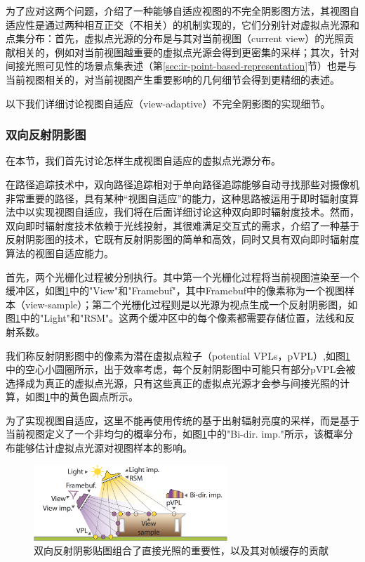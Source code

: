 为了应对这两个问题，\cite{a:MakingImperfectShadowMapsViewAdaptive}介绍了一种能够自适应视图的不完全阴影图方法，其视图自适应性是通过两种相互正交（不相关）的机制实现的，它们分别针对虚拟点光源和点集分布：首先，虚拟点光源的分布是与其对当前视图（current view）的光照贡献相关的，例如对当前视图越重要的虚拟点光源会得到更密集的采样；其次，针对间接光照可见性的场景点集表述（第\ref{sec:ir-point-based-representation}节）也是与当前视图相关的，对当前视图产生重要影响的几何细节会得到更精细的表述。

以下我们详细讨论视图自适应（view-adaptive）不完全阴影图的实现细节。




\subsubsection{双向反射阴影图}
在本节，我们首先讨论怎样生成视图自适应的虚拟点光源分布。

在路径追踪技术中，双向路径追踪相对于单向路径追踪能够自动寻找那些对摄像机非常重要的路径，具有某种“视图自适应”的能力，这种思路被运用于即时辐射度算法中以实现视图自适应，我们将在后面详细讨论这种双向即时辐射度技术\cite{a:BidirectionalInstantRadiosity}。然而，双向即时辐射度技术依赖于光线投射，其很难满足交互式的需求，\cite{a:MakingImperfectShadowMapsViewAdaptive}介绍了一种基于反射阴影图的技术，它既有反射阴影图的简单和高效，同时又具有双向即时辐射度算法的视图自适应能力。

首先，两个光栅化过程被分别执行。其中第一个光栅化过程将当前视图渲染至一个缓冲区，如图\ref{f:ir-adaptive-rsm}中的"View"和"Framebuf"，其中Framebuf中的像素称为一个视图样本（view-sample）；第二个光栅化过程则是以光源为视点生成一个反射阴影图，如图\ref{f:ir-adaptive-rsm}中的"Light"和"RSM"。这两个缓冲区中的每个像素都需要存储位置，法线和反射系数。

我们称反射阴影图中的像素为潜在虚拟点粒子（potential VPLs，pVPL）,如图\ref{f:ir-adaptive-rsm}中的空心小圆圈所示，出于效率考虑，每个反射阴影图中可能只有部分pVPL会被选择成为真正的虚拟点光源，只有这些真正的虚拟点光源才会参与间接光照的计算，如图\ref{f:ir-adaptive-rsm}中的黄色圆点所示。 

为了实现视图自适应，这里不能再使用传统的基于出射辐射亮度的采样，而是基于当前视图定义了一个非均匀的概率分布，如图\ref{f:ir-adaptive-rsm}中的"Bi-dir. imp."所示，该概率分布能够估计虚拟点光源对视图样本的影响。

\begin{figure}
	\sidecaption
	\includegraphics[width=0.65\textwidth]{figures/ir/ir-5-1}
	\caption{双向反射阴影贴图组合了直接光照的重要性，以及其对帧缓存的贡献}
	\label{f:ir-adaptive-rsm}
\end{figure}

